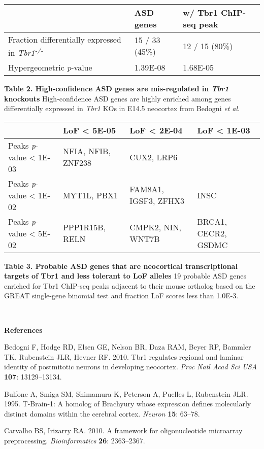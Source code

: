 \documentclass[]{article}
\begin{document}
\textbf{\\
}

\begin{longtable}[]{@{}lll@{}}
\toprule
~ & ASD genes & w/ Tbr1 ChIP-seq peak\tabularnewline
\midrule
\endhead
Fraction differentially expressed in \emph{Tbr1\textsuperscript{-/-}} &
15 / 33 (45\%) & 12 / 15 (80\%)\tabularnewline
Hypergeometric \emph{p}-value & 1.39E-08 & 1.68E-05\tabularnewline
\bottomrule
\end{longtable}

\textbf{Table 2. High-confidence ASD genes are mis-regulated in
\emph{Tbr1} knockouts} High-confidence ASD genes are highly enriched
among genes differentially expressed in \emph{Tbr1} KOs in E14.5
neocortex from Bedogni \emph{et al}.

\begin{longtable}[]{@{}llll@{}}
\toprule
~ & LoF \textless{} 5E-05 & LoF \textless{} 2E-04 & LoF \textless{}
1E-03\tabularnewline
\midrule
\endhead
Peaks \emph{p}-value \textless{} 1E-03 & NFIA, NFIB, ZNF238 & CUX2, LRP6
& ~\tabularnewline
Peaks \emph{p}-value \textless{} 1E-02 & MYT1L, PBX1 & FAM8A1, IGSF3,
ZFHX3 & INSC\tabularnewline
Peaks \emph{p}-value \textless{} 5E-02 & PPP1R15B, RELN & CMPK2, NIN,
WNT7B & BRCA1, CECR2, GSDMC\tabularnewline
\bottomrule
\end{longtable}

\textbf{Table 3. Probable ASD genes that are neocortical transcriptional
targets of Tbr1 and less tolerant to LoF alleles} 19 probable ASD genes
enriched for Tbr1 ChIP-seq peaks adjacent to their mouse ortholog based
on the GREAT single-gene binomial test and fraction LoF scores less than
1.0E-3.

\textbf{\\
}

\textbf{References}

Bedogni F, Hodge RD, Elsen GE, Nelson BR, Daza RAM, Beyer RP, Bammler
TK, Rubenstein JLR, Hevner RF. 2010. Tbr1 regulates regional and laminar
identity of postmitotic neurons in developing neocortex. \emph{Proc Natl
Acad Sci USA} \textbf{107}: 13129--13134.

Bulfone A, Smiga SM, Shimamura K, Peterson A, Puelles L, Rubenstein JLR.
1995. T-Brain-1: A homolog of Brachyury whose expression defines
molecularly distinct domains within the cerebral cortex. \emph{Neuron}
\textbf{15}: 63--78.

Carvalho BS, Irizarry RA. 2010. A framework for oligonucleotide
microarray preprocessing. \emph{Bioinformatics} \textbf{26}: 2363--2367.
\end{document}
